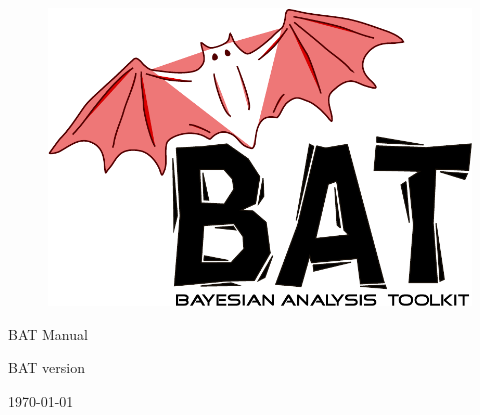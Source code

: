 \documentclass[
12pt,
a4paper,
bibliography=totoc,
captions=nooneline, %
numbers=noenddot,
twoside]{scrbook}
\newcommand{\BAT}{{\scshape BAT}\xspace}
\newcommand{\version}{version~\versionno}
\begin{document}

\thispagestyle{empty}

\begin{figure}
\includegraphics[scale=0.25]{bat}
\end{figure}

\vspace*{1cm}

\begin{center}


{\Large \BAT Manual}
\\

\vspace{1cm}

{\large \BAT \version}

\end{center}

\thispagestyle{empty}

\vfill

\begin{center}
\today
\end{center}

\pagebreak


\thispagestyle{empty}

\enlargethispage{2cm}

\tableofcontents{}


\mainmatter
\end{document}
